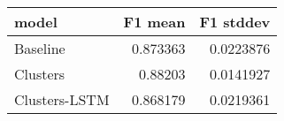 \begin{tabular}{lrr}
\toprule
 model         &   F1 mean &   F1 stddev \\
\midrule
 Baseline      &  0.873363 &   0.0223876 \\
 Clusters      &  0.88203  &   0.0141927 \\
 Clusters-LSTM &  0.868179 &   0.0219361 \\
\bottomrule
\end{tabular}